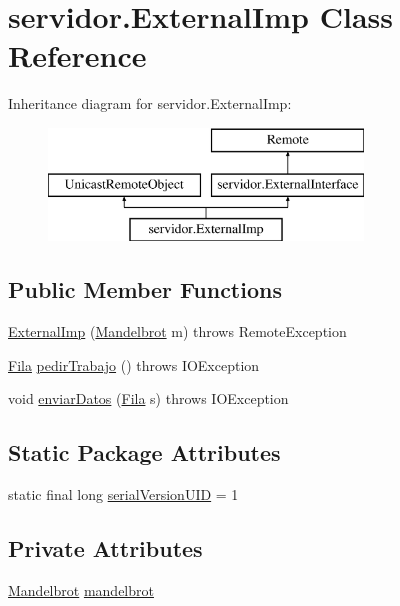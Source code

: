 \hypertarget{classservidor_1_1ExternalImp}{}\section{servidor.\+External\+Imp Class Reference}
\label{classservidor_1_1ExternalImp}
Inheritance diagram for servidor.\+External\+Imp\+:\begin{figure}[H]
\begin{center}
\leavevmode
\includegraphics[height=3.000000cm]{classservidor_1_1ExternalImp}
\end{center}
\end{figure}
\subsection*{Public Member Functions}
\begin{DoxyCompactItemize}
\item 
\hyperlink{classservidor_1_1ExternalImp_ae947cf00b8b40f5c06f6d360af21eae1}{External\+Imp} (\hyperlink{classservidor_1_1Mandelbrot}{Mandelbrot} m)  throws Remote\+Exception 
\item 
\hyperlink{classservidor_1_1Fila}{Fila} \hyperlink{classservidor_1_1ExternalImp_aa182d667cda5c438286ea7c63feeee28}{pedir\+Trabajo} ()  throws I\+O\+Exception 
\item 
void \hyperlink{classservidor_1_1ExternalImp_afaf8689cf3cb8f02a4c11247beca695c}{enviar\+Datos} (\hyperlink{classservidor_1_1Fila}{Fila} s)  throws I\+O\+Exception 
\end{DoxyCompactItemize}
\subsection*{Static Package Attributes}
\begin{DoxyCompactItemize}
\item 
static final long \hyperlink{classservidor_1_1ExternalImp_acd2877f2e18786a8a54008ceaa0af042}{serial\+Version\+U\+ID} = 1
\end{DoxyCompactItemize}
\subsection*{Private Attributes}
\begin{DoxyCompactItemize}
\item 
\hyperlink{classservidor_1_1Mandelbrot}{Mandelbrot} \hyperlink{classservidor_1_1ExternalImp_a5e902f152fac9ceebb5cbc8db1b71f01}{mandelbrot}
\end{DoxyCompactItemize}


